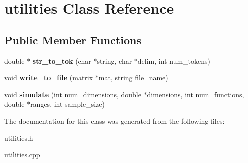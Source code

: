 \hypertarget{classutilities}{}\section{utilities Class Reference}
\label{classutilities}
\subsection*{Public Member Functions}
\begin{DoxyCompactItemize}
\item 
\mbox{\label{classutilities_a72504733e9384ade61daaa0e5b55ed32}} 
double $\ast$ {\bfseries str\+\_\+to\+\_\+tok} (char $\ast$string, char $\ast$delim, int num\+\_\+tokens)
\item 
\mbox{\label{classutilities_a0fac2805e79a2a19e520ef69b5b13bcd}} 
void {\bfseries write\+\_\+to\+\_\+file} (\mbox{\hyperlink{classmatrix}{matrix}} $\ast$mat, string file\+\_\+name)
\item 
\mbox{\label{classutilities_a440ebef57004db18af104d4d2a162e1f}} 
void {\bfseries simulate} (int num\+\_\+dimensions, double $\ast$dimensions, int num\+\_\+functions, double $\ast$ranges, int sample\+\_\+size)
\end{DoxyCompactItemize}


The documentation for this class was generated from the following files\+:\begin{DoxyCompactItemize}
\item 
utilities.\+h\item 
utilities.\+cpp\end{DoxyCompactItemize}
